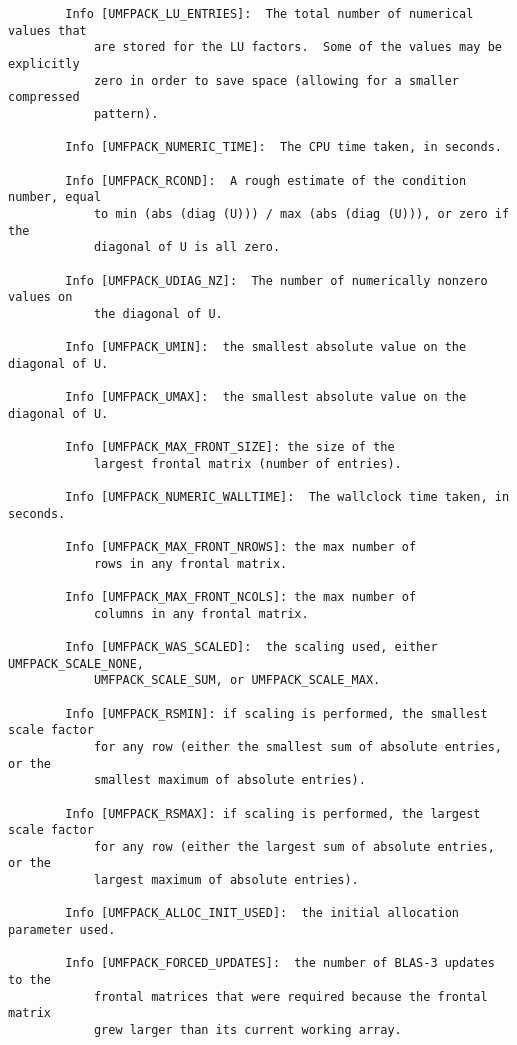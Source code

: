 \documentclass[11pt]{article}
\begin{document}
{\begin{verbatim}
        Info [UMFPACK_LU_ENTRIES]:  The total number of numerical values that
            are stored for the LU factors.  Some of the values may be explicitly
            zero in order to save space (allowing for a smaller compressed
            pattern).

        Info [UMFPACK_NUMERIC_TIME]:  The CPU time taken, in seconds.

        Info [UMFPACK_RCOND]:  A rough estimate of the condition number, equal
            to min (abs (diag (U))) / max (abs (diag (U))), or zero if the
            diagonal of U is all zero.

        Info [UMFPACK_UDIAG_NZ]:  The number of numerically nonzero values on
            the diagonal of U.

        Info [UMFPACK_UMIN]:  the smallest absolute value on the diagonal of U.

        Info [UMFPACK_UMAX]:  the smallest absolute value on the diagonal of U.

        Info [UMFPACK_MAX_FRONT_SIZE]: the size of the
            largest frontal matrix (number of entries).

        Info [UMFPACK_NUMERIC_WALLTIME]:  The wallclock time taken, in seconds.

        Info [UMFPACK_MAX_FRONT_NROWS]: the max number of
            rows in any frontal matrix.

        Info [UMFPACK_MAX_FRONT_NCOLS]: the max number of
            columns in any frontal matrix.

        Info [UMFPACK_WAS_SCALED]:  the scaling used, either UMFPACK_SCALE_NONE,
            UMFPACK_SCALE_SUM, or UMFPACK_SCALE_MAX.

        Info [UMFPACK_RSMIN]: if scaling is performed, the smallest scale factor
            for any row (either the smallest sum of absolute entries, or the
            smallest maximum of absolute entries).

        Info [UMFPACK_RSMAX]: if scaling is performed, the largest scale factor
            for any row (either the largest sum of absolute entries, or the
            largest maximum of absolute entries).

        Info [UMFPACK_ALLOC_INIT_USED]:  the initial allocation parameter used.

        Info [UMFPACK_FORCED_UPDATES]:  the number of BLAS-3 updates to the
            frontal matrices that were required because the frontal matrix
            grew larger than its current working array.


\end{verbatim}}
\end{document}
